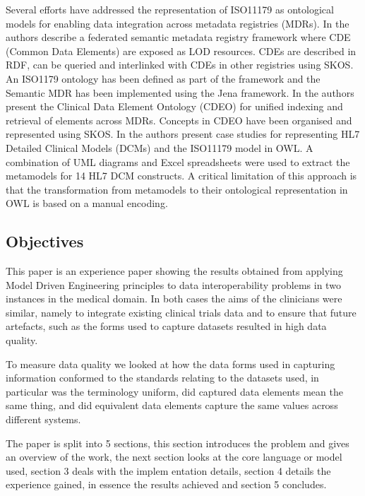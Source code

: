 


Several efforts have addressed the representation of ISO11179 as
ontological models for enabling data integration across metadata
registries (MDRs). In \cite{Sinaci2013784} the authors describe a
federated semantic metadata registry framework where CDE (Common Data
Elements) are exposed as LOD resources. CDEs are described in RDF, can
be queried and interlinked with CDEs in other registries using
SKOS. An ISO1179 ontology has been defined as part of the framework
and the Semantic MDR has been implemented using the Jena framework. In
\cite{pmid25405066} the authors present the Clinical Data Element
Ontology (CDEO) for unified indexing and retrieval of elements across
MDRs. Concepts in CDEO have been organised and represented using
SKOS. In \cite{pmid22211181} the authors present case studies for
representing HL7 Detailed Clinical Models (DCMs) and the ISO11179
model in OWL. A combination of UML diagrams and Excel spreadsheets
were used to extract the metamodels for 14 HL7 DCM constructs. A
critical limitation of this approach is that the transformation from
metamodels to their ontological representation in OWL is based on a
manual encoding.



\subsection{Objectives}
This paper is an experience paper showing the results obtained from applying Model Driven Engineering principles to data interoperability problems in two instances in the medical domain. In both cases the aims of the clinicians were similar, namely to integrate existing clinical trials data and to ensure that future artefacts, such as the forms used to capture datasets resulted in high data quality. 

To measure data quality we looked at how the data forms used in capturing information conformed to the standards relating to the datasets used, in particular was the terminology uniform, did captured data elements mean the same thing, and did equivalent data elements capture the same values across different systems.


The paper is split into 5 sections, this section introduces the problem and gives an overview of the work, the next section looks at the core language or model used, section 3 deals with the implem   entation details, section 4 details the experience gained, in essence the results achieved and section 5 concludes.

